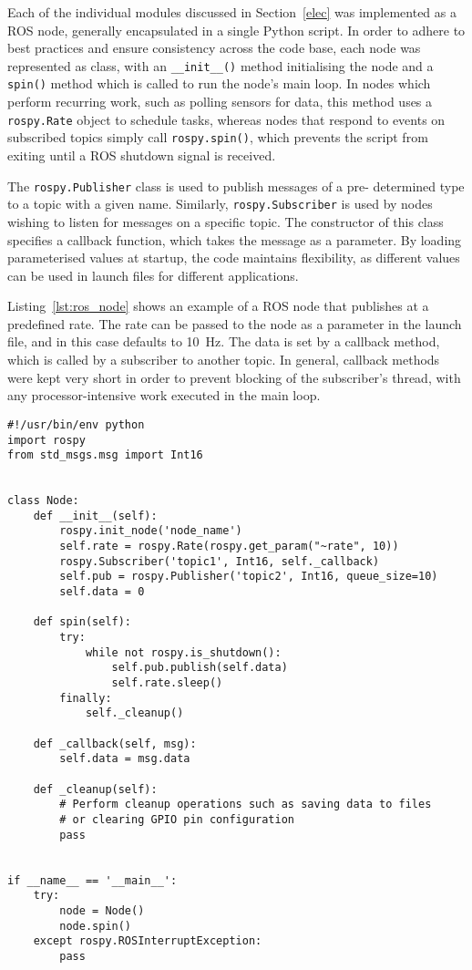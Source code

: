 Each of the individual modules discussed in Section~\ref{elec} was
implemented as a ROS node, generally encapsulated in a single Python
script. In order to adhere to best practices and ensure consistency across
the code base, each node was represented as class, with an
\verb|__init__()| method initialising the node and a \verb|spin()| method
which is called to run the node's main loop. In nodes which perform
recurring work, such as polling sensors for data, this method uses a
\verb|rospy.Rate| object to schedule tasks, whereas nodes that respond to
events on subscribed topics simply call \verb|rospy.spin()|, which
prevents the script from exiting until a ROS shutdown signal is received.

The \verb|rospy.Publisher| class is used to publish messages of a pre-
determined type to a topic with a given name. Similarly,
\verb|rospy.Subscriber| is used by nodes wishing to listen for messages on
a specific topic. The constructor of this class specifies a callback
function, which takes the message as a parameter. By loading parameterised
values at startup, the code maintains flexibility, as different values can
be used in launch files for different applications.

Listing~\ref{lst:ros_node} shows an example of a ROS node that publishes
at a predefined rate. The rate can be passed to the node as a parameter in
the launch file, and in this case defaults to \SI{10}{\Hz}. The data is
set by a callback method, which is called by a subscriber to another
topic. In general, callback methods were kept very short in order to
prevent blocking of the subscriber's thread, with any processor-intensive
work executed in the main loop.

\begin{lstlisting}[caption={Example ROS node}, label={lst:ros_node}]
#!/usr/bin/env python
import rospy
from std_msgs.msg import Int16


class Node:
    def __init__(self):
        rospy.init_node('node_name')
        self.rate = rospy.Rate(rospy.get_param("~rate", 10))
        rospy.Subscriber('topic1', Int16, self._callback)
        self.pub = rospy.Publisher('topic2', Int16, queue_size=10)
        self.data = 0

    def spin(self):
        try:
            while not rospy.is_shutdown():
                self.pub.publish(self.data)
                self.rate.sleep()
        finally:
            self._cleanup()

    def _callback(self, msg):
        self.data = msg.data

    def _cleanup(self):
        # Perform cleanup operations such as saving data to files
        # or clearing GPIO pin configuration
        pass


if __name__ == '__main__':
    try:
        node = Node()
        node.spin()
    except rospy.ROSInterruptException:
        pass
\end{lstlisting}


